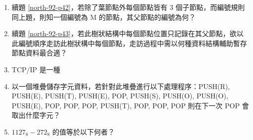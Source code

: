 \documentclass[12pt,a4paper]{report}
\begin{document}
\begin{CJK}{UTF8}{bkai}
\begin{enumerate}
\item \label{north-92-p43} 續題 \ref{north-92-p42}，若除了葉節點外每個節點皆有 3 個子節點，而編號規則同上題，則知一個編號為 M 的節點，其父節點的編號為何？
\item 續題 \ref{north-92-p43}，若此樹狀結構中每個節點位置只記錄在其父節點，欲以此編號順序走訪此樹狀構中每個節點，走訪過程中需以何種資料結構輔助暫存節點資料最合適？
\item TCP/IP 是一種
\item 以一個堆疊儲存字元資料，若針對此堆疊進行以下處理程序：PUSH(R), PUSH(E), PUSH(T), PUSH(E), POP, PUSH(S), PUSH(O), PUSH(O), PUSH(E), POP, POP, POP, PUSH(T), POP, POP, POP 則在下一次 POP 會取出什麼字元？
\item ${1127}_{8}-{272}_{8}$ 的值等於以下何者？
\end{enumerate}
\end{CJK}
\end{document}
